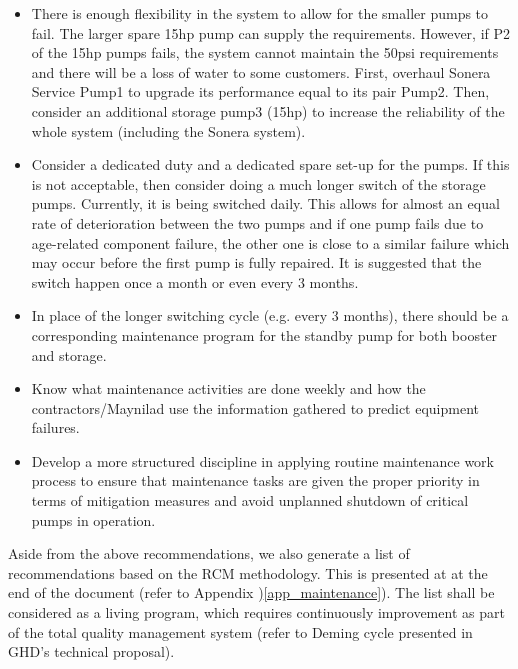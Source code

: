 \begin{itemize}
	\item There is enough flexibility in the system to allow for the smaller pumps to fail.  The larger spare 15hp pump can supply the requirements. However, if P2 of the 15hp pumps fails, the system cannot maintain the 50psi requirements and there will be a loss of water to some customers. First, overhaul Sonera Service Pump1 to upgrade its performance equal to its pair Pump2. Then, consider an additional storage pump3 (15hp) to increase the reliability of the whole system (including the Sonera system).
	
	\item Consider a dedicated duty and a dedicated spare set-up for the pumps.  If this is not acceptable, then consider doing a much longer switch of the storage pumps.  Currently, it is being switched daily.  This allows for almost an equal rate of deterioration between the two pumps and if one pump fails due to age-related component failure, the other one is close to a similar failure which may occur before the first pump is fully repaired.  It is suggested that the switch happen once a month or even every 3 months.
	
	\item In place of the longer switching cycle (e.g. every 3 months), there should be a corresponding maintenance program for the standby pump for both booster and storage.
	
	\item Know what maintenance activities are done weekly and how the contractors/Maynilad use the information gathered to predict equipment failures.  
	
	\item Develop a more structured discipline in applying routine maintenance work process to ensure that maintenance tasks are given the proper priority in terms of mitigation measures and avoid unplanned shutdown of critical pumps in operation.
	
\end{itemize}

Aside from the above recommendations, we also generate a list of recommendations based on the RCM methodology. This is presented at at the end of the document (refer to Appendix )\ref{app_maintenance}). The list shall be considered as a living program, which requires continuously improvement as part of the total quality management system (refer to Deming cycle presented in GHD's technical proposal).

%